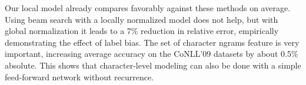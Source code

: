 Our local model already compares favorably against these methods on average.
Using beam search with a locally normalized model does not help, but with global normalization
it leads to a 7\% reduction in relative error, empirically demonstrating the effect of label bias.
The set of character ngrams feature is very important, increasing average
accuracy on the CoNLL'09 datasets by about 0.5\% absolute. 
This shows that character-level modeling can also be done with a simple feed-forward
network without recurrence.
